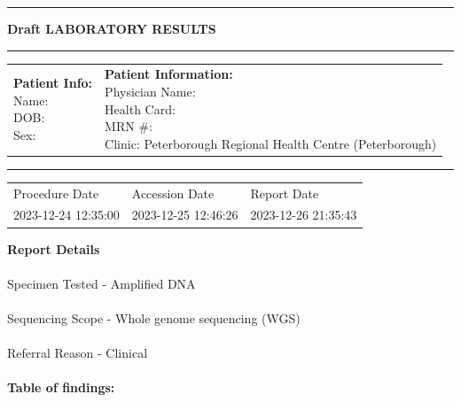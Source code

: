\documentclass[11pt]{extarticle}
\begin{document}
\hfill

\hrule
\begin{center}
{\Huge \bf Draft LABORATORY RESULTS}
\end{center}
\hrule

\begin{tabular}{p{9cm} p{6cm}}
\parbox[t]{9cm}{
  \textbf{\Large Patient Info:} \\[0.5em]
  Name: \\
  DOB: \\
  Sex: \\
}
&
\parbox[t]{6cm}{
  \textbf{\Large Patient Information:} \\[0.5em]
  Physician Name:\\
  Health Card:\\
  MRN \#: \\
  Clinic: Peterborough Regional Health Centre (Peterborough) %
}
\end{tabular}
\vspace{2em}
\hrule
{}
{\bf
\begin{tabularx}{\textwidth}{C C C}
Procedure Date & Accession Date & Report Date \\
2023-12-24 12:35:00 & 2023-12-25 12:46:26 & 2023-12-26 21:35:43
\end{tabularx}
}
\vspace{1.5em}

{\bf \Large Report Details}
\\ \\
Specimen Tested - Amplified DNA \\ \\ %
Sequencing Scope - Whole genome sequencing (WGS) \\ \\
Referral Reason - Clinical\\ \\

{\bf \Huge Table of findings:}
\vspace{1em}
\end{document}

